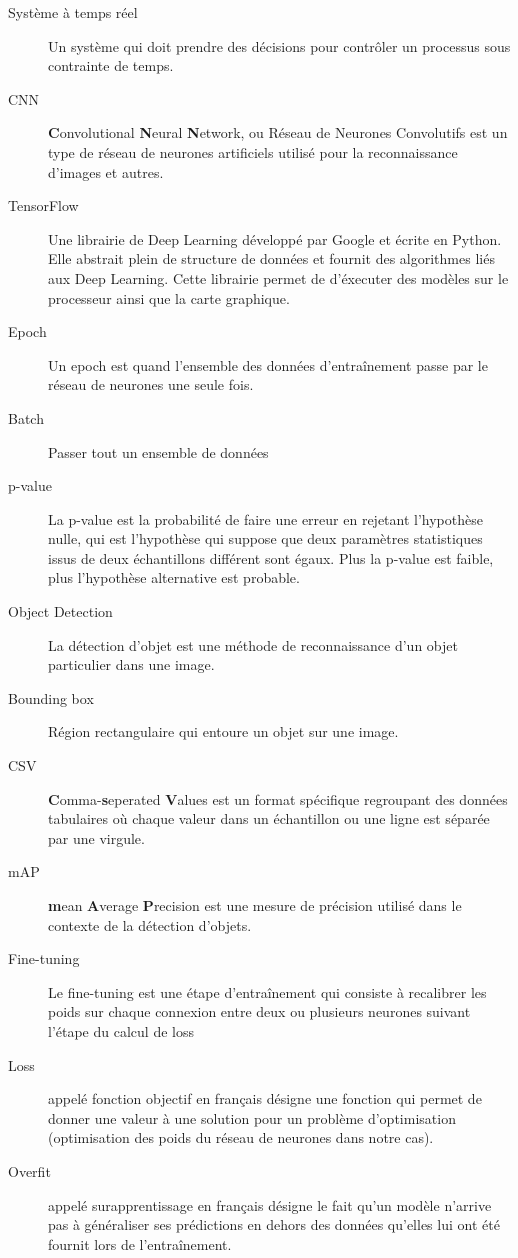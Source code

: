 \documentclass[french]{article}
\theoremstyle{mytheoremstyle}
\theoremstyle{mytheoremstyle}
\theoremstyle{myproblemstyle}
\begin{document}
\begin{description}  
\item [Système à temps réel] Un système qui doit prendre des décisions pour contrôler un processus sous contrainte de temps.
\item [CNN] \textbf{C}onvolutional \textbf{N}eural \textbf{N}etwork, ou Réseau de Neurones Convolutifs est un type de réseau de neurones artificiels utilisé pour la reconnaissance d'images et autres.
\item [TensorFlow] Une librairie de Deep Learning développé par Google et écrite en Python. Elle abstrait plein de structure de données et fournit des algorithmes liés aux Deep Learning. Cette librairie permet de d'éxecuter des modèles sur le processeur ainsi que la carte graphique.
\item [Epoch] Un epoch est quand l'ensemble des données d'entraînement passe par le réseau de neurones une seule fois.
\item [Batch] Passer tout un ensemble de données 
\item [p-value] La p-value est la probabilité de faire une erreur en rejetant l'hypothèse nulle, qui est l'hypothèse qui suppose que deux paramètres statistiques issus de deux échantillons différent sont égaux. Plus la p-value est faible, plus l'hypothèse alternative est probable.
\item [Object Detection] La détection d'objet est une méthode de reconnaissance d'un objet particulier dans une image.
\item [Bounding box] Région rectangulaire qui entoure un objet sur une image.
\item [CSV] \textbf{C}omma-\textbf{s}eperated \textbf{V}alues est un format spécifique regroupant des données tabulaires où chaque valeur dans un échantillon ou une ligne est séparée par une virgule.
\item [mAP] \textbf{m}ean \textbf{A}verage \textbf{P}recision est une mesure de précision utilisé dans le contexte de la détection d'objets.
\item [Fine-tuning] Le fine-tuning est une étape d'entraînement qui consiste à recalibrer les poids sur chaque connexion entre deux ou plusieurs neurones suivant l'étape du calcul de loss
\item [Loss] appelé fonction objectif en français désigne une fonction qui permet de donner une valeur à une solution pour un problème d'optimisation (optimisation des poids du réseau de neurones dans notre cas).
\item [Overfit] appelé surapprentissage en français désigne le fait qu'un modèle n'arrive pas à généraliser ses prédictions en dehors des données qu'elles lui ont été fournit lors de l'entraînement.
\end{description}
\end{document}
